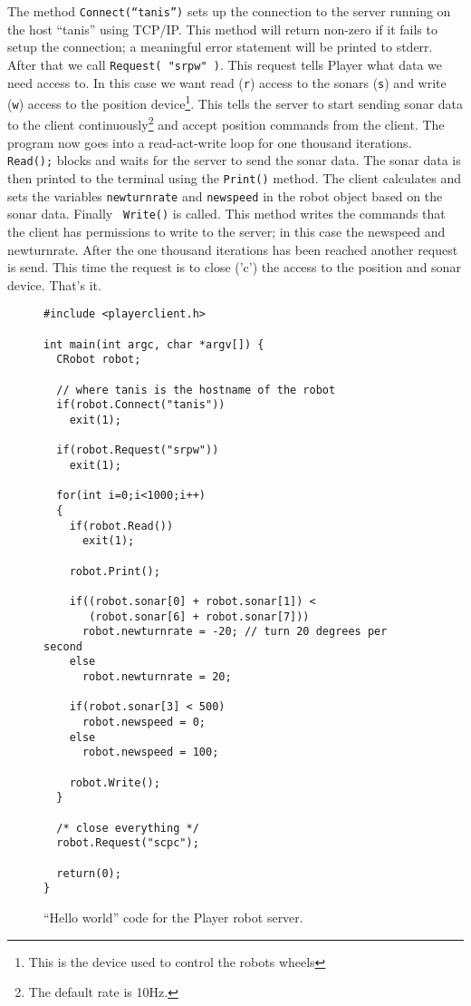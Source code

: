 \documentclass[11pt]{article}
\begin{document}
The method {\tt Connect(``tanis'')} sets up the connection to the server
running on the host ``tanis'' using TCP/IP. This method will
return non-zero if it fails to setup the connection; a meaningful
error statement will be printed to stderr.
After that we call {\tt Request( "srpw" )}.
This request tells Player what data we need access to. In this
case we want read ({\tt r}) access to the sonars ({\tt s}) and write ({\tt w})
access to the position device\footnote{This is the device used to 
control the robots wheels}. This tells the server to start sending
sonar data to the client continuously\footnote{The default rate is 
10Hz.} and accept position commands from the client. The program now
goes into a read-act-write loop for one thousand iterations. {\tt 
Read();} blocks and waits for the server to send
the sonar data.
The sonar data is then printed to the terminal using the {\tt Print()}
method. The client calculates and sets the variables {\tt newturnrate} and
{\tt newspeed} in the robot object based on the sonar data. Finally {\tt 
Write()} is called. This method writes the commands that the client has 
permissions to write to the server; in this case the newspeed and 
newturnrate. After the one thousand iterations has been reached another
request is send. This time the request is to close ('c') the access to
the position and sonar device. That's it.

\begin{figure}
\begin{verbatim}
#include <playerclient.h>

int main(int argc, char *argv[]) {
  CRobot robot;

  // where tanis is the hostname of the robot
  if(robot.Connect("tanis"))
    exit(1);

  if(robot.Request("srpw")) 
    exit(1); 

  for(int i=0;i<1000;i++) 
  {
    if(robot.Read())
      exit(1);

    robot.Print();

    if((robot.sonar[0] + robot.sonar[1]) < 
       (robot.sonar[6] + robot.sonar[7])) 
      robot.newturnrate = -20; // turn 20 degrees per second
    else
      robot.newturnrate = 20;
 
    if(robot.sonar[3] < 500) 
      robot.newspeed = 0;
    else 
      robot.newspeed = 100;
 
    robot.Write();
  }

  /* close everything */
  robot.Request("scpc");

  return(0);
}
\end{verbatim}

\caption{ ``Hello world'' code for the Player robot server.}
\label{helloworld}
\end{figure}
\end{document}
